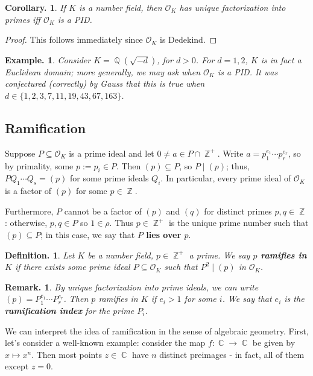 \documentclass[11pt, a4paper]{memoir}
\DeclareMathOperator{\Q}{{\mathbb{Q}}}
\DeclareMathOperator{\Z}{{\mathbb{Z}}}
\DeclareMathOperator{\C}{{\mathbb{C}}}
\theoremstyle{change}
\newtheorem{corollary}[theorem]{Corollary.}
\theoremstyle{plain}
\theoremstyle{nonumberplain}
\newtheorem{definition}{Definition.}
\newtheorem{example}{Example.}
\newtheorem{remark}{Remark.}
\newtheorem{proof}{Proof}
\newcommand{\mbf}[1]{{\boldmath\bfseries #1}}
\numberwithin{equation}{section}
\begin{document}
\begin{corollary}
    If $K$ is a number field, then $\mathcal{O}_K$ has unique factorization into primes iff $\mathcal{O}_K$ is a PID.
\end{corollary}
\begin{proof}
    This follows immediately since $\mathcal{O}_K$ is Dedekind.
\end{proof}
\begin{example}
    Consider $K=\Q(\sqrt{-d})$, for $d>0$.
    For $d=1,2$, $K$ is in fact a Euclidean domain; more generally, we may ask when $\mathcal{O}_K$ is a PID.
    It was conjectured (correctly) by Gauss that this is true when $d\in\{1,2,3,7,11,19,43,67,163\}$.
\end{example}
\subsection{Ramification}
Suppose $P\subseteq\mathcal{O}_K$ is a prime ideal and let $0\neq a\in P\cap\Z^+$.
Write $a=p_1^{e_1}\cdots p_r^{e_r}$, so by primality, some $p:=p_i\in P$.
Then $(p)\subseteq P$, so $P\mid(p)$; thus, $PQ_1\cdots Q_s=(p)$ for some prime ideals $Q_i$.
In particular, every prime ideal of $\mathcal{O}_K$ is a factor of $(p)$ for some $p\in\Z$.

Furthermore, $P$ cannot be a factor of $(p)$ and $(q)$ for distinct primes $p,q\in\Z$: otherwise, $p,q\in P$ so $1\in\rho$.
Thus $p\in \Z^+$ is the unique prime number such that $(p)\subseteq P$; in this case, we say that \mbf{$P$ lies over $p$}.
\begin{definition}
    Let $K$ be a number field, $p\in\Z^+$ a prime.
    We say \mbf{$p$ ramifies in $K$} if there exists some prime ideal $P\subseteq\mathcal{O}_K$ such that $P^2\mid(p)$ in $\mathcal{O}_K$.
\end{definition}
\begin{remark}
    By unique factorization into prime ideals, we can write $(p)=P_1^{e_1}\cdots P_r^{e_r}$.
    Then $p$ ramifies in $K$ if $e_i>1$ for some $i$.
    We say that $e_i$ is the \mbf{ramification index} for the prime $P_i$.

\end{remark}
We can interpret the idea of ramification in the sense of algebraic geometry.
First, let's consider a well-known example: consider the map $f:\C\to\C$ be given by $x\mapsto x^n$.
Then most points $z\in\C$ have $n$ distinct preimages - in fact, all of them except $z=0$.
\end{document}
